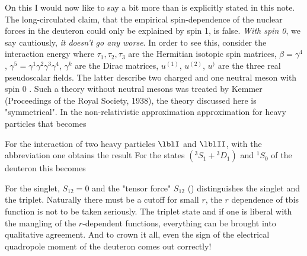 On this I would now like to say a bit more than is explicitly stated in this note. The long-circulated claim, that the empirical spin-dependence of the nuclear forces in the deuteron could only be explained by spin 1, is false. \textit{With spin 0}, we say cautiously, \textit{it doesn't go any worse}. In order to see this, consider the interaction energy
where $\tau_1, \tau_2, \tau_3$ are the Hermitian isotopic spin matrices, $\beta=\gamma^4$, $\gamma^5=\gamma^1\gamma^2\gamma^3\gamma^4$, $\gamma^k$ are the Dirac matrices, $u^{(1)}$, $u^{(2)}$, $u^{)}$ are the three real pseudoscalar fields. The latter describe two charged and one neutral meson with spin 0 \comment{!!}. Such a theory without neutral mesons was treated by Kemmer (Proceedings of the Royal Society, 1938), the theory discussed here is "symmetrical". In the non-relativistic approximation approximation for heavy particles that becomes

For the interaction of two heavy particles $\lblI$ and $\lblII$, with the abbreviation
one obtains the result
For the states $({}^3S_1 + {}^3D_1)$ and ${}^1S_0$ of the deuteron this becomes

For the singlet, $S_{12} = 0$ and the "tensor force" $S_{12}$ () distinguishes the singlet and the triplet. Naturally there must be a cutoff for small $r$, the $r$ dependence of tbis function is not to be taken seriously. The triplet state  and if one is liberal with the mangling of the $r$-dependent functions, everything can be brought into qualitative agreement. And to crown it all, even the sign of the electrical quadropole moment of the deuteron comes out correctly!

